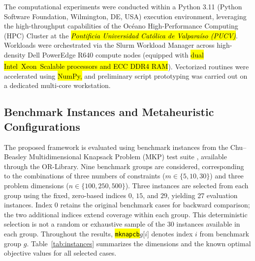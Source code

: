 \documentclass[mathematics,article,accept,moreauthors]{Definitions/mdpi}
\begin{document}
The computational experiments were conducted within a Python 3.11 (Python Software Foundation, Wilmington, DE, USA) execution environment, leveraging the high-throughput capabilities of the Océano High-Performance Computing (HPC) Cluster at the \textit{\hl{Pontificia Universidad Católica de Valparaíso (PUCV)}}. Workloads were orchestrated via the Slurm Workload Manager across high-density Dell PowerEdge R640 compute nodes (equipped with \hl{dual Intel\textsuperscript{\textregistered}\ Xeon\textsuperscript{\textregistered}\ Scalable processors and ECC DDR4 RAM}). %
 Vectorized routines were accelerated using \hl{NumPy,} %
 and preliminary script prototyping was carried out on a dedicated multi-core workstation.

\subsection{Benchmark Instances and Metaheuristic Configurations}
\label{sec:instances}

The proposed framework is evaluated using benchmark instances from the
Chu--Beasley Multidimensional Knapsack Problem (MKP) test suite
\cite{chu1998genetic}, available through the OR-Library. Nine benchmark
groups are considered, corresponding to the combinations of three numbers
of constraints ($m\in\{5,10,30\}$) and three problem dimensions
($n\in\{100,250,500\}$). Three instances are selected from each group
using the fixed, zero-based indices $0$, $15$, and $29$, yielding 27
evaluation instances. Index $0$ retains the original benchmark cases for
backward comparison; the two additional indices extend coverage within
each group. This deterministic selection is not a random or exhaustive
sample of the 30 instances available in each group.
Throughout the results, \texttt{\hl{mknapcb}}$g$[$i$] denotes index $i$ from
benchmark group $g$. Table~\ref{tab:instances} summarizes the dimensions
and the known optimal objective values for all selected cases.
\end{document}
